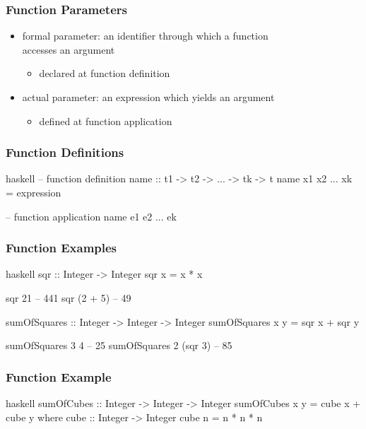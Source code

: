 \documentclass[dvipsnames]{beamer}
\theoremstyle{plain}
\begin{document}
\begin{frame}
  \frametitle{Function Parameters}

  \begin{itemize}
    \item \alert{formal parameter}: an identifier through which a function\\
      accesses an argument
    \begin{itemize}
      \item declared at function definition
    \end{itemize}

    \pause
    \medskip
    \item \alert{actual parameter}: an expression which yields an argument
    \begin{itemize}
      \item defined at function application
    \end{itemize}
  \end{itemize}
\end{frame}

\begin{frame}[fragile]
  \frametitle{Function Definitions}

  \begin{block}{}
    \begin{pygments}{haskell}
-- function definition
name :: t1 -> t2 -> ... -> tk -> t
name x1 x2 ... xk = expression

-- function application
name e1 e2 ... ek
    \end{pygments}
  \end{block}
\end{frame}

\begin{frame}[fragile]
  \frametitle{Function Examples}

  \begin{exampleblock}{}
    \begin{pygments}{haskell}
sqr :: Integer -> Integer
sqr x = x * x

sqr 21      -- 441
sqr (2 + 5) -- 49

sumOfSquares :: Integer -> Integer -> Integer
sumOfSquares x y = sqr x + sqr y

sumOfSquares 3 4       -- 25
sumOfSquares 2 (sqr 3) -- 85
    \end{pygments}
  \end{exampleblock}
\end{frame}

\begin{frame}[fragile]
  \frametitle{Function Example}

  \begin{exampleblock}{}
    \begin{pygments}{haskell}
sumOfCubes :: Integer -> Integer -> Integer
sumOfCubes x y = cube x + cube y
  where
    cube :: Integer -> Integer
    cube n = n * n * n
    \end{pygments}
  \end{exampleblock}
\end{frame}
\end{document}
